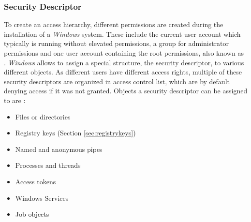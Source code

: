 \subsubsection{Security Descriptor}
\label{sec:sd}
To create an access hierarchy, different permissions are created during the installation of a \emph{Windows} system. These include the current user account which typically is running without elevated permissions, a group for administrator permissions and one user account containing the root permissions, also known as  \cite{msdn_localsystem1, msdn_localsystem2}. \emph{Windows} allows to assign a special structure, the security descriptor, to various different objects. As different users have different access rights, multiple of these security descriptors are organized in access control list, which are by default denying access if it was not granted. Objects a security descriptor can be assigned to are \cite{msdn_sd}:
\begin{itemize}
\item Files or directories
\item Registry keys (Section \ref{sec:registrykeys})
\item Named and anonymous pipes
\item Processes and threads
\item Access tokens
\item Windows Services
\item Job objects
\end{itemize}